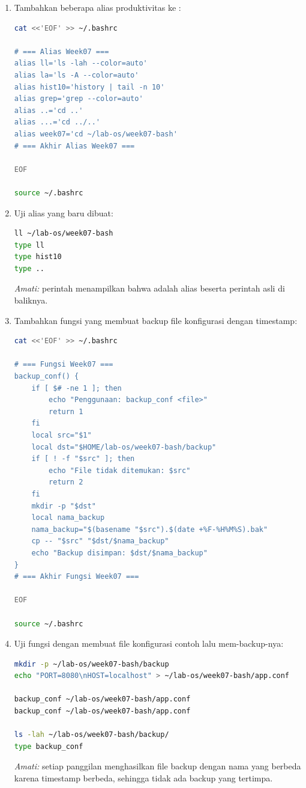 \begin{enumerate}
    \item Tambahkan beberapa alias produktivitas ke :
\begin{lstlisting}[language=bash, caption={Menambahkan alias ke .bashrc}]
cat <<'EOF' >> ~/.bashrc

# === Alias Week07 ===
alias ll='ls -lah --color=auto'
alias la='ls -A --color=auto'
alias hist10='history | tail -n 10'
alias grep='grep --color=auto'
alias ..='cd ..'
alias ...='cd ../..'
alias week07='cd ~/lab-os/week07-bash'
# === Akhir Alias Week07 ===

EOF

source ~/.bashrc
\end{lstlisting}

    \item Uji alias yang baru dibuat:
\begin{lstlisting}[language=bash, caption={Menguji alias}]
ll ~/lab-os/week07-bash
type ll
type hist10
type ..
\end{lstlisting}
    \textit{Amati:} perintah  menampilkan bahwa  adalah
    alias beserta perintah asli di baliknya.

    \item Tambahkan fungsi  yang membuat backup file
          konfigurasi dengan timestamp:
\begin{lstlisting}[language=bash, caption={Menambahkan fungsi backup\_conf ke .bashrc}]
cat <<'EOF' >> ~/.bashrc

# === Fungsi Week07 ===
backup_conf() {
    if [ $# -ne 1 ]; then
        echo "Penggunaan: backup_conf <file>"
        return 1
    fi
    local src="$1"
    local dst="$HOME/lab-os/week07-bash/backup"
    if [ ! -f "$src" ]; then
        echo "File tidak ditemukan: $src"
        return 2
    fi
    mkdir -p "$dst"
    local nama_backup
    nama_backup="$(basename "$src").$(date +%F-%H%M%S).bak"
    cp -- "$src" "$dst/$nama_backup"
    echo "Backup disimpan: $dst/$nama_backup"
}
# === Akhir Fungsi Week07 ===

EOF

source ~/.bashrc
\end{lstlisting}

    \item Uji fungsi dengan membuat file konfigurasi contoh lalu
          mem-backup-nya:
\begin{lstlisting}[language=bash, caption={Menguji fungsi backup\_conf}]
mkdir -p ~/lab-os/week07-bash/backup
echo "PORT=8080\nHOST=localhost" > ~/lab-os/week07-bash/app.conf

backup_conf ~/lab-os/week07-bash/app.conf
backup_conf ~/lab-os/week07-bash/app.conf

ls -lah ~/lab-os/week07-bash/backup/
type backup_conf
\end{lstlisting}
    \textit{Amati:} setiap panggilan  menghasilkan file
    backup dengan nama yang berbeda karena timestamp berbeda, sehingga tidak
    ada backup yang tertimpa.
\end{enumerate}

